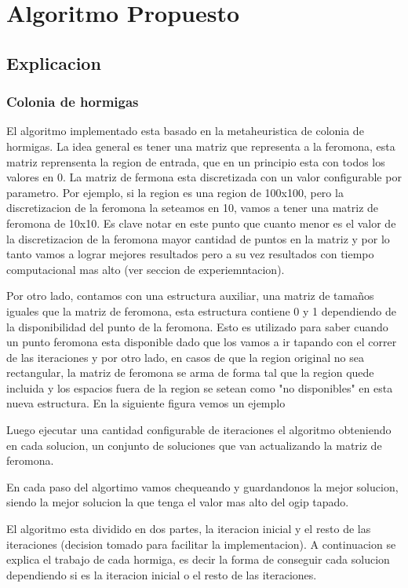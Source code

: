 \newpage
\section{Algoritmo Propuesto}\label{sec:algoritmo}
\subsection{Explicacion}

\subsubsection{Colonia de hormigas}

El algoritmo implementado esta basado en la metaheuristica de colonia de hormigas. La idea general es tener una matriz que representa a la feromona, esta matriz reprensenta la region de entrada, que en un principio esta con todos los valores en 0. La matriz de fermona esta discretizada con un valor configurable por parametro. Por ejemplo, si la region es una region de 100x100, pero la discretizacion de la feromona la seteamos en 10, vamos a tener una matriz de feromona de 10x10. Es clave notar en este punto que cuanto menor es el valor de la discretizacion de la feromona mayor cantidad de puntos en la matriz y por lo tanto vamos a lograr mejores resultados pero a su vez resultados con tiempo computacional mas alto (ver seccion de experiemntacion).

Por otro lado, contamos con una estructura auxiliar, una matriz de tamaños iguales que la matriz de feromona, esta estructura contiene 0 y 1 dependiendo de la disponibilidad del punto de la feromona. Esto es utilizado para saber cuando un punto feromona esta disponible dado que los vamos a ir tapando con el correr de las iteraciones y por otro lado, en casos de que la region original no sea rectangular, la matriz de feromona se arma de forma tal que la region quede incluida y los espacios fuera de la region se setean como "no disponibles" en esta nueva estructura. En la siguiente figura vemos un ejemplo


Luego ejecutar una cantidad configurable de iteraciones el algoritmo obteniendo en cada solucion, un conjunto de soluciones que van actualizando la matriz de feromona. 

En cada paso del algortimo vamos chequeando y guardandonos la mejor solucion, siendo la mejor solucion la que tenga el valor mas alto del ogip tapado.

El algoritmo esta dividido en dos partes, la iteracion inicial y el resto de las iteraciones (decision tomado para facilitar la implementacion). A continuacion se explica el trabajo de cada hormiga, es decir la forma de conseguir cada solucion dependiendo si es la iteracion inicial o el resto de las iteraciones.

